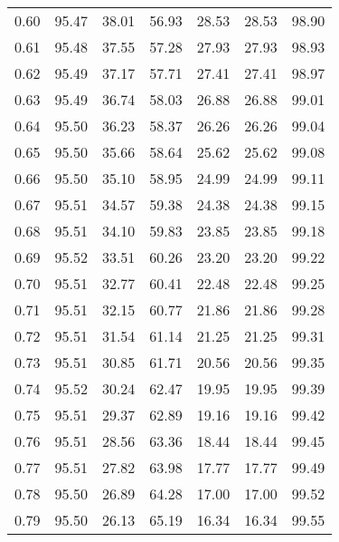 \begin{tabular}{|c|c|c|c|c|c|c|}
      0.60 &     95.47 &     38.01 &      56.93 &   28.53 &      28.53 &         98.90 \\
      0.61 &     95.48 &     37.55 &      57.28 &   27.93 &      27.93 &         98.93 \\
      0.62 &     95.49 &     37.17 &      57.71 &   27.41 &      27.41 &         98.97 \\
      0.63 &     95.49 &     36.74 &      58.03 &   26.88 &      26.88 &         99.01 \\
      0.64 &     95.50 &     36.23 &      58.37 &   26.26 &      26.26 &         99.04 \\
      0.65 &     95.50 &     35.66 &      58.64 &   25.62 &      25.62 &         99.08 \\
      0.66 &     95.50 &     35.10 &      58.95 &   24.99 &      24.99 &         99.11 \\
      0.67 &     95.51 &     34.57 &      59.38 &   24.38 &      24.38 &         99.15 \\
      0.68 &     95.51 &     34.10 &      59.83 &   23.85 &      23.85 &         99.18 \\
      0.69 &     95.52 &     33.51 &      60.26 &   23.20 &      23.20 &         99.22 \\
      0.70 &     95.51 &     32.77 &      60.41 &   22.48 &      22.48 &         99.25 \\
      0.71 &     95.51 &     32.15 &      60.77 &   21.86 &      21.86 &         99.28 \\
      0.72 &     95.51 &     31.54 &      61.14 &   21.25 &      21.25 &         99.31 \\
      0.73 &     95.51 &     30.85 &      61.71 &   20.56 &      20.56 &         99.35 \\
      0.74 &     95.52 &     30.24 &      62.47 &   19.95 &      19.95 &         99.39 \\
      0.75 &     95.51 &     29.37 &      62.89 &   19.16 &      19.16 &         99.42 \\
      0.76 &     95.51 &     28.56 &      63.36 &   18.44 &      18.44 &         99.45 \\
      0.77 &     95.51 &     27.82 &      63.98 &   17.77 &      17.77 &         99.49 \\
      0.78 &     95.50 &     26.89 &      64.28 &   17.00 &      17.00 &         99.52 \\
      0.79 &     95.50 &     26.13 &      65.19 &   16.34 &      16.34 &         99.55 \\

\end{tabular}
